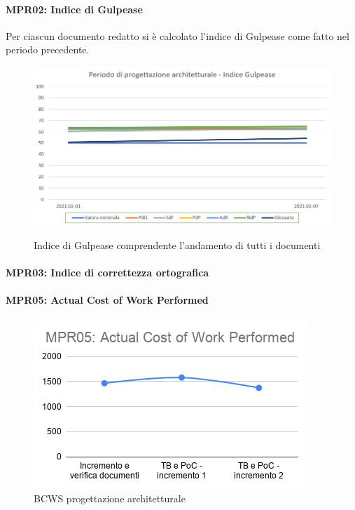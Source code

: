 \paragraph*{MPR02: Indice di Gulpease}
Per ciascun documento redatto si è calcolato l'indice di Gulpease come fatto nel periodo precedente.
\begin{figure}[ht]
	\centering
	\includegraphics[scale=0.6]{Immagini/GulpeaseProgettazioneArchitetturale}\\
	\caption{Indice di Gulpease comprendente l'andamento di tutti i documenti}
	\label{fig:GulpeaseProgettazioneArchitetturale}
\end{figure}
\paragraph*{MPR03: Indice di correttezza ortografica}
\paragraph*{MPR05: Actual Cost of Work Performed}
\begin{figure}[ht]
	\centering
	\includegraphics[scale=0.6]{Immagini/ACWP_PArchitetturale.png}
	\caption{BCWS progettazione architetturale}
	\label{fig:ACWP_PArchitetturale}
\end{figure}
